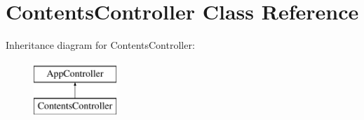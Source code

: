 \hypertarget{class_contents_controller}{
\section{\-Contents\-Controller \-Class \-Reference}
\label{class_contents_controller}
}
\-Inheritance diagram for \-Contents\-Controller\-:\begin{figure}[H]
\begin{center}
\leavevmode
\includegraphics[height=2.000000cm]{class_contents_controller}
\end{center}
\end{figure}
